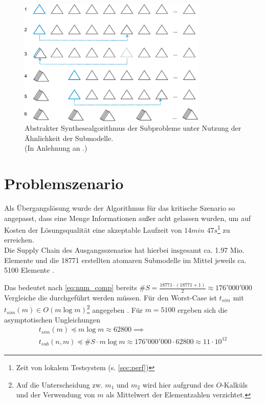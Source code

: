\begin{figure}
	\centering
	\includegraphics[width=0.80\textwidth]{Bilder/similarity_algorithm.pdf} 
	\caption{Abstrakter Synthesealgorithmus der Subprobleme unter Nutzung der Ähnlichkeit der Submodelle. \\ (In Anlehnung an \cite{Kniasew.21.02.2022}.)}
	\label{fig:sim_alg}
\end{figure} 

\section{Problemszenario} \label{sec:problem}

Als Übergangslösung wurde der Algorithmus für das kritische Szenario so angepasst, dass eine Menge Informationen außer acht gelassen wurden, um auf Kosten der Lösungsqualität eine akzeptable Laufzeit von $14 min$ $47 s$\footnote{Zeit von lokalem Testsystem (s. \autoref{sec:perf})} zu erreichen. \\
Die Supply Chain des Ausgangsszenarios hat hierbei insgesamt ca. 1.97 Mio. Elemente und die 18771 erstellten atomaren Submodelle im Mittel jeweils ca. 5100 Elemente \cite{Kniasew.21.02.2022}. 

Das bedeutet nach \autoref{eq:num_comp} bereits $\#S = \frac{18771 \cdot (18771 + 1)} {2} \approx 176'000'000$ Vergleiche die durchgeführt werden müssen. Für den Worst-Case ist  $t_{sim}$ mit $t_{sim}(m) \in O(m \log m)$\footnote{Auf die Unterscheidung zw. $m_{1}$ und $m_{2}$ wird hier aufgrund des $O$-Kalküls und der Verwendung von $m$ als Mittelwert der Elementzahlen verzichtet.} angegeben \cite{Kniasew.21.02.2022}. Für $m=5100$ ergeben sich die asymptotischen Ungleichungen 
\begin{align}
	t_{sim}(m) \preccurlyeq m \log m \approx 62800 \implies \nonumber \\
	\label{eq:conrete_id_obj} t_{sub}(n, m) \preccurlyeq \#S \cdot m \log m \approx 176'000'000 \cdot 62800 \approx 11 \cdot 10^{12}
\end{align}


